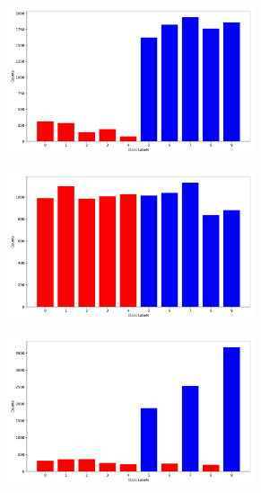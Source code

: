 \begin{figure}[H]
    \centering
    \begin{subfigure}{0.45\textwidth}
        \centering
        \includegraphics[width=0.8\textwidth]{Figures/Methods/dis_ub09.png}
    \end{subfigure}
    \hfill
    \begin{subfigure}{0.45\textwidth}
        \centering
        \includegraphics[width=0.8\textwidth]{Figures/Methods/dis_ub09_inw.png}
    \end{subfigure}
    \hfill
    \begin{subfigure}{0.45\textwidth}
        \centering
        \includegraphics[width=0.8\textwidth]{Figures/Methods/dis_ubfs.png}

\end{subfigure}
\end{figure}
